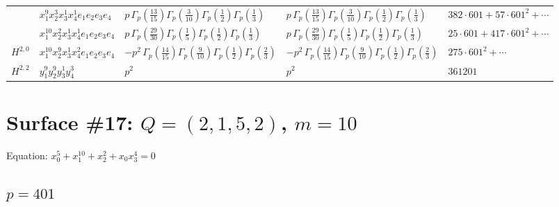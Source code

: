 \documentclass[11pt]{article}
\begin{document}
\begin{table}[ht]
{\begin{tabular}{@{}lllll@{}}
 & $x_{1}^{9} x_{2}^{3} x_{3}^{1} x_{4}^{1}  e_{1} e_{2} e_{3} e_{4}$ & $p \, \Gamma_p \left( \frac{13}{15} \right) \Gamma_p \left( \frac{3}{10} \right) \Gamma_p \left( \frac{1}{2} \right) \Gamma_p \left( \frac{1}{3} \right)$ & $p \, \Gamma_p \left( \frac{13}{15} \right) \Gamma_p \left( \frac{3}{10} \right) \Gamma_p \left( \frac{1}{2} \right) \Gamma_p \left( \frac{1}{3} \right)$ & $382{\cdot}601{+}57{\cdot}601^{2}{+}\cdots$ \\
 & $x_{1}^{10} x_{2}^{2} x_{3}^{1} x_{4}^{1}  e_{1} e_{2} e_{3} e_{4}$ & $p \, \Gamma_p \left( \frac{29}{30} \right) \Gamma_p \left( \frac{1}{5} \right) \Gamma_p \left( \frac{1}{2} \right) \Gamma_p \left( \frac{1}{3} \right)$ & $p \, \Gamma_p \left( \frac{29}{30} \right) \Gamma_p \left( \frac{1}{5} \right) \Gamma_p \left( \frac{1}{2} \right) \Gamma_p \left( \frac{1}{3} \right)$ & $25{\cdot}601{+}417{\cdot}601^{2}{+}\cdots$ \\
\midrule
$H^{2,0}$ & $x_{1}^{10} x_{2}^{9} x_{3}^{1} x_{4}^{2}  e_{1} e_{2} e_{3} e_{4}$ & $- p^{2} \, \Gamma_p \left( \frac{14}{15} \right) \Gamma_p \left( \frac{9}{10} \right) \Gamma_p \left( \frac{1}{2} \right) \Gamma_p \left( \frac{2}{3} \right)$ & $- p^{2} \, \Gamma_p \left( \frac{14}{15} \right) \Gamma_p \left( \frac{9}{10} \right) \Gamma_p \left( \frac{1}{2} \right) \Gamma_p \left( \frac{2}{3} \right)$ & $275{\cdot}601^{2}{+}\cdots$ \\
\midrule
$H^{2,2}$ & $y_{1}^{9} y_{2}^{9} y_{3}^{1} y_{4}^{3}$ & $p^{2} \,$ & $p^{2} \,$ & $361201$ \\
\bottomrule
\end{tabular}
}
\renewcommand{\arraystretch}{1.0}
\end{table}

\newpage

\section*{Surface \#17: $Q=(2, 1, 5, 2)$, $m=10$}

Equation: $x_0^{5} + x_1^{10} + x_2^{2} + x_0 x_3^{4} = 0$

\subsection*{$p = 401$}
\end{document}
